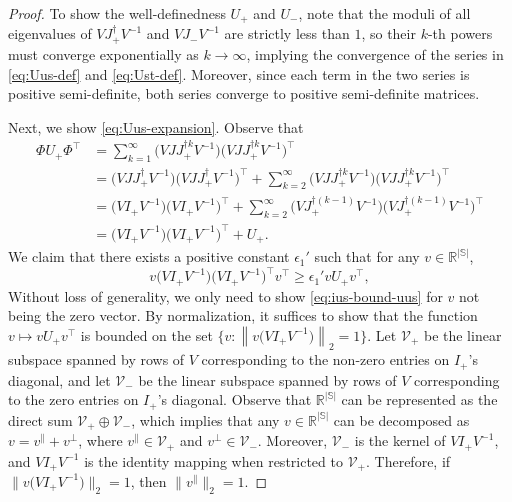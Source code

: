 \documentclass[11pt,letterpaper]{article}
\theoremstyle{plain}
\theoremstyle{definition}
\theoremstyle{remark}
\newcommand{\norm}[1]{\left\lVert#1\right\rVert}
\newcommand{\normplain}[1]{\lVert#1\rVert}
\newcommand{\R}{\mathbb{R}}
\newcommand{\sspa}{\mathbb{S}}
\newcommand{\gapus}{\epsilon_1} %
\newcommand{\subus}{+}%
\newcommand{\subst}{-}%
\newcommand{\Jus}{J_{\subus}}
\newcommand{\Jst}{J_{\subst}}
\newcommand{\Ius}{I_{\subus}}
\newcommand{\Uus}{U_{\subus}}
\newcommand{\Ust}{U_{\subst}}
\newcommand{\spus}{\mathcal{V}_{\subus}}
\newcommand{\spst}{\mathcal{V}_{\subst}}
\begin{document}
\begin{proof} %
    To show the well-definedness $\Uus$ and $\Ust$, note that the moduli of all eigenvalues of $V \Jus^{\dagger} V^{-1}$ and $V \Jst V^{-1}$ are strictly less than $1$, so their $k$-th powers must converge exponentially as $k\to\infty$, implying the convergence of the series in \eqref{eq:Uus-def} and \eqref{eq:Ust-def}. Moreover, since each term in the two series is positive semi-definite, both series converge to positive semi-definite matrices.

    Next, we show \eqref{eq:Uus-expansion}. Observe that
    \begin{align*}
        \Phi \Uus \Phi^\top
        &= \sum_{k=1}^\infty \big(V J \Jus^{\dagger k} V^{-1}\big)\big(V J \Jus^{\dagger k} V^{-1}\big)^\top \\
        &= \big(V J \Jus^{\dagger} V^{-1}\big)\big(V J \Jus^{\dagger} V^{-1}\big)^\top +  
        \sum_{k=2}^\infty \big(V J \Jus^{\dagger k} V^{-1}\big)\big(V J \Jus^{\dagger k} V^{-1}\big)^\top \\
        &= \big(V \Ius V^{-1}\big)\big(V \Ius V^{-1}\big)^\top +  
        \sum_{k=2}^\infty \big(V \Jus^{\dagger (k-1)} V^{-1}\big)\big(V \Jus^{\dagger (k-1)} V^{-1}\big)^\top  \\
        &= \big(V \Ius V^{-1}\big)\big(V \Ius V^{-1}\big)^\top + \Uus. 
    \end{align*}
    We claim that there exists a positive constant $\gapus'$ such that for any $v \in \R^{|\sspa|}$, 
    \begin{equation}
        \label{eq:ius-bound-uus}
        v\big(V \Ius V^{-1}\big)\big(V \Ius V^{-1}\big)^\top v^\top \geq \gapus' v \Uus v^\top,
    \end{equation}
    Without loss of generality, we only need to show \eqref{eq:ius-bound-uus} for $v$ not being the zero vector. By normalization, it suffices to show that the function $v\mapsto v \Uus v^\top$ is bounded on the set  $\{v\colon \norm{v\big(V \Ius V^{-1}\big)}_2 = 1\}$.  
    Let $\spus$ be the linear subspace spanned by rows of $V$ corresponding to the non-zero entries on $\Ius$'s diagonal, and let $\spst$ be the linear subspace spanned by rows of $V$ corresponding to the zero entries on $\Ius$'s diagonal. 
    Observe that $\R^{|\sspa|}$ can be represented as the direct sum $\spus \oplus \spst$, which implies that any $v\in\R^{|\sspa|}$ can be decomposed as $v = v^\parallel + v^\perp$, where $v^\parallel \in \spus$ and $v^\perp \in \spst$. 
    Moreover, $\spst$ is the kernel of $V \Ius V^{-1}$, and $V \Ius V^{-1}$ is the identity mapping when restricted to $\spus$. Therefore, if $\normplain{v\big(V \Ius V^{-1}\big)}_2 = 1$, then $\normplain{v^\parallel}_2 = 1$. 

\end{proof}
\end{document}
